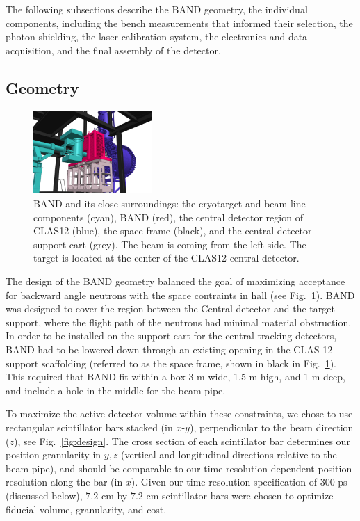 \documentclass[review,number,sort&compress]{elsarticle}
\begin{document}
The following subsections describe the BAND geometry, the individual components,
including the bench measurements that informed their selection, the photon
shielding, the laser calibration system, the electronics and data acquisition, 
and the final assembly of the detector.

\subsection{Geometry}
\begin{figure}[tb]
	\centering
		\includegraphics[width=0.40\textwidth]{FULL_CONTEXT_STUDIE_3.jpg}
		\vspace{0.5cm}
	    \caption{BAND and its close surroundings: the
                  cryotarget and beam line components (cyan),  BAND
                  (red), the central detector region of CLAS12
                  (blue), the space frame (black), and the central detector support cart (grey). The beam is coming from the left side. The
                  target is located at the center of the CLAS12 central detector.}
		\label{fig:bandtarget}
		
\end{figure}

The design of the BAND geometry balanced the goal of maximizing acceptance for backward angle neutrons
with the space contraints in hall (see Fig.~\ref{fig:bandtarget}). BAND was designed to cover the region
between the Central detector and the target support, where the flight path of the neutrons had minimal
material obstruction. In order to be installed on the support cart for the central tracking detectors, BAND
had to be lowered down through an existing opening in the CLAS-12 support scaffolding (referred to as the space
frame, shown in black in Fig.~\ref{fig:bandtarget}). This required that BAND fit within a box 3-\si{\meter} wide, 1.5-\si{\meter} high, and 1-\si{\meter} deep, and include a hole in the middle for the beam pipe. 


To maximize the active detector volume within these constraints, we
chose to use rectangular scintillator bars stacked (in $x$-$y$), perpendicular to
the beam direction ($z$), see Fig.~\ref{fig:design}.  The cross
section of each scintillator bar determines our position granularity
in $y,z$ (vertical and longitudinal directions relative to the beam
pipe), and should be comparable to our time-resolution-dependent position
resolution along the bar (in $x$). Given our time-resolution specification of
$300$ \si{\pico\second} (discussed below), $7.2$
\si{\centi\meter} by $7.2$ \si{\centi\meter} scintillator bars were
chosen to optimize fiducial volume, granularity, and cost.
\end{document}
